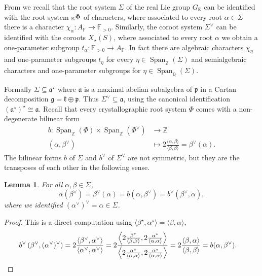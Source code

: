 \documentclass[12pt]{amsart}
\newcommand{\F}{\mathbb{F} }
\newcommand{\R}{\mathbb{R} }
\newcommand{\Z}{\mathbb{Z} }
\newcommand{\K}{\mathbb{K}}
\newcommand{\frakg}{\mathfrak{g}}
\newcommand{\frakp}{\mathfrak{p}}
\newcommand{\frakk}{\mathfrak{k}}
\newcommand{\fraka}{\mathfrak{a}}
\newcommand{\KPhi}{\vphantom{\Phi}_{\K}\Phi}
\numberwithin{equation}{section}
\newtheorem{lemma}[theorem]{Lemma}
\theoremstyle{remark} %
\begin{document}
From \cite[Section \ref{I-sec:compatibility}]{AppAGRCF} we recall that the root system $\Sigma$ of the real Lie group $G_\R$ can be identified with the root system $\KPhi$ of characters, where associated to every root $\alpha \in \Sigma$ there is a character $\chi_\alpha \colon A_\F \to \F_{>0}$. Similarly, the coroot system $\Sigma^\vee$ can be identified with the coroots $X_{\star}(S)$, where associated to every root $\alpha$ we obtain a one-parameter subgroup $t_\alpha \colon \F_{>0} \to A_\F$. In fact there are algebraic characters $\chi_\eta$ and one-parameter subgroups $t_\eta$ for every $\eta \in \operatorname{Span}_{\mathbb{Z}}(\Sigma)$ and semialgebraic characters and one-parameter subgroups for $\eta \in \operatorname{Span}_{\mathbb{Q}}(\Sigma)$. 

Formally $\Sigma \subseteq \fraka^\star$ where $\fraka$ is a maximal abelian subalgebra of $\frakp$ in a Cartan decomposition $\frakg = \frakk \oplus \frakp$. Thus $\Sigma^\vee \subseteq \fraka$, using the canonical identification $(\fraka^\star)^\star \cong \fraka$. Recall that every crystallographic root system $\Phi$ comes with a non-degenerate bilinear form
\begin{align*}
	b \colon \operatorname{Span}_{\Z}(\Phi) \times \operatorname{Span}_\Z(\Phi^\vee) & \to  \Z \\
	(\alpha, \beta^\vee) &\mapsto %
	2\frac{\langle \alpha ,\beta\rangle}{\langle \beta, \beta\rangle} = \beta^\vee (\alpha).
\end{align*}
The bilinear forms $b$ of $\Sigma$ and $b^\vee$ of $\Sigma^\vee$ are not symmetric, but they are the transposes of each other in the following sense.
\begin{lemma}\label{lem:coroot_transpose}
	For all $\alpha, \beta \in \Sigma $,
	$$
	\alpha(\beta^\vee) = \beta^\vee (\alpha) = b(\alpha, \beta^\vee) = b^\vee (\beta^\vee, \alpha),
	$$
	where we identified $(\alpha^\vee)^\vee = \alpha \in \Sigma$.
\end{lemma}
\begin{proof}
	This is a direct computation using $\langle \beta^\star, \alpha^\star \rangle = \langle \beta, \alpha \rangle$,
	\begin{align*}
		b^\vee \left( \beta^\vee, (\alpha^\vee)^\vee \right) 
		&= 2 \frac{ \langle \beta^\vee, \alpha^\vee \rangle }{\langle \alpha^\vee, \alpha^\vee \rangle} = 2 \frac{\left\langle 2 \frac{\beta^\star}{\langle \beta, \beta \rangle}, 2 \frac{\alpha^\star}{\langle \alpha, \alpha \rangle} \right\rangle }{ \left\langle 2 \frac{\alpha^\star}{\langle \alpha, \alpha \rangle}, 2 \frac{\alpha^\star}{\langle \alpha, \alpha \rangle} \right\rangle } 
		= 2 \frac{\langle \beta, \alpha \rangle}{\langle \beta, \beta \rangle} = b(\alpha, \beta^\vee). \qedhere
	\end{align*}
\end{proof}
\end{document}
